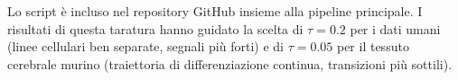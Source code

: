 Lo script è incluso nel repository GitHub insieme alla pipeline principale. I risultati di questa taratura hanno guidato la scelta di $\tau = 0.2$ per i dati umani (linee cellulari ben separate, segnali più forti) e di $\tau = 0.05$ per il tessuto cerebrale murino (traiettoria di differenziazione continua, transizioni più sottili).
